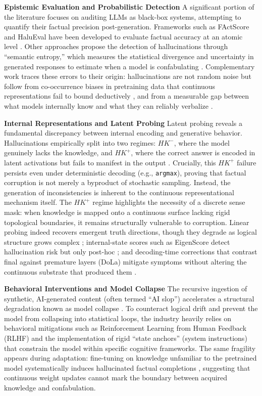 \documentclass{article}
\begin{document}
\textbf{Epistemic Evaluation and Probabilistic Detection} A significant
portion of the literature focuses on auditing LLMs as black-box systems,
attempting to quantify their factual precision post-generation.
Frameworks such as FActScore and HaluEval have been developed to
evaluate factual accuracy at an atomic level
\citep{factscore2023, halueval2023}. Other approaches propose the
detection of hallucinations through ``semantic entropy,'' which measures
the statistical divergence and uncertainty in generated responses to
estimate when a model is confabulating \citep{semantic_entropy2024}.
Complementary work traces these errors to their origin: hallucinations
are not random noise but follow from co-occurrence biases in pretraining
data that continuous representations fail to bound deductively
\citep{mckenna2023}, and from a measurable gap between what models
internally know and what they can reliably verbalize \citep{yin2023}.

\textbf{Internal Representations and Latent Probing} Latent probing
reveals a fundamental discrepancy between internal encoding and
generative behavior. Hallucinations empirically split into two regimes:
\(HK^{-}\), where the model genuinely lacks the knowledge, and
\(HK^{+}\), where the correct answer is encoded in latent activations
but fails to manifest in the output
\citep{orgad2025iclr, simhi2024distinguishing}. Crucially, this
\(HK^{+}\) failure persists even under deterministic decoding (e.g.,
\texttt{argmax}), proving that factual corruption is not merely a
byproduct of stochastic sampling. Instead, the generation of
inconsistencies is inherent to the continuous representational mechanism
itself. The \(HK^{+}\) regime highlights the necessity of a discrete
sense mask: when knowledge is mapped onto a continuous surface lacking
rigid topological boundaries, it remains structurally vulnerable to
corruption. Linear probing indeed recovers emergent truth directions,
though they degrade as logical structure grows complex
\citep{marks2024}; internal-state scores such as EigenScore detect
hallucination risk but only post-hoc \citep{chen2024}; and decoding-time
corrections that contrast final against premature layers (DoLa) mitigate
symptoms without altering the continuous substrate that produced them
\citep{chuang2024}.

\textbf{Behavioral Interventions and Model Collapse} The recursive
ingestion of synthetic, AI-generated content (often termed ``AI slop'')
accelerates a structural degradation known as model collapse
\citep{shumailov2024, kommers2025slop}. To counteract logical drift and
prevent the model from collapsing into statistical loops, the industry
heavily relies on behavioral mitigations such as Reinforcement Learning
from Human Feedback (RLHF) and the implementation of rigid ``state
anchors'' (system instructions) that constrain the model within specific
cognitive frameworks. The same fragility appears during adaptation:
fine-tuning on knowledge unfamiliar to the pretrained model
systematically induces hallucinated factual completions
\citep{gekhman2024, kang2025}, suggesting that continuous weight updates
cannot mark the boundary between acquired knowledge and confabulation.
\end{document}
